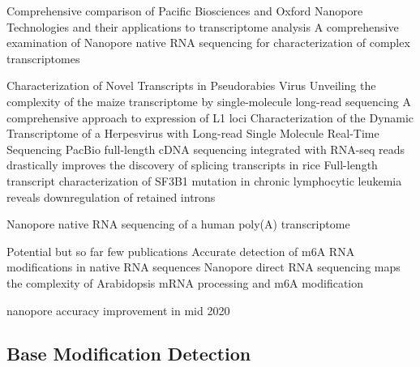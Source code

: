 Comprehensive comparison of Pacific Biosciences and Oxford Nanopore Technologies and their applications to transcriptome analysis \cite{Weirather2017}
A comprehensive examination of Nanopore native RNA sequencing for characterization of complex transcriptomes \cite{Soneson2019}

Characterization of Novel Transcripts in Pseudorabies Virus \cite{Tombacz2015}
Unveiling the complexity of the maize transcriptome by single-molecule long-read sequencing \cite{Wang2016}
A comprehensive approach to expression of L1 loci \cite{Deininger2017}
Characterization of the Dynamic Transcriptome of a Herpesvirus with Long-read Single Molecule Real-Time Sequencing \cite{Tombacz2017}
PacBio full-length cDNA sequencing integrated with RNA-seq reads drastically improves the discovery of splicing transcripts in rice \cite{Zhang2019a}
Full-length transcript characterization of SF3B1 mutation in chronic lymphocytic leukemia reveals downregulation of retained introns \cite{Tang2020}

Nanopore native RNA sequencing of a human poly(A) transcriptome \cite{Workman2019}

Potential but so far few publications
Accurate detection of m6A RNA modifications in native RNA sequences \cite{Liu2019}
Nanopore direct RNA sequencing maps the complexity of Arabidopsis mRNA processing and m6A modification \cite{Parker2020}

nanopore accuracy improvement in mid 2020




\subsection{Base Modification Detection}
\label{subsec:state_of_art:basemod}

